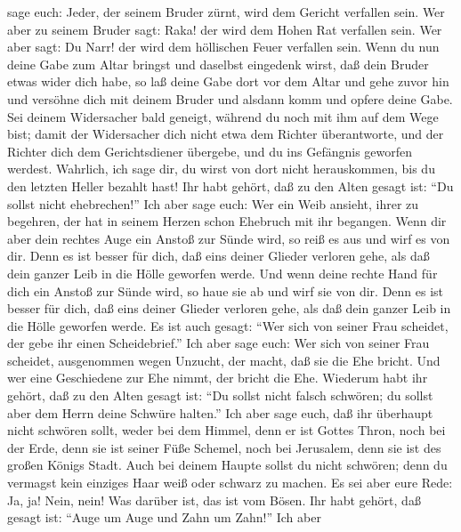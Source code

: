 sage euch: Jeder, der seinem Bruder zürnt, wird dem Gericht verfallen
sein. Wer aber zu seinem Bruder sagt: Raka! der wird dem Hohen Rat
verfallen sein. Wer aber sagt: Du Narr! der wird dem höllischen Feuer
verfallen sein.  Wenn du nun deine Gabe zum Altar bringst
und daselbst eingedenk wirst, daß dein Bruder etwas wider dich habe,
 so laß deine Gabe dort vor dem Altar und gehe zuvor hin
und versöhne dich mit deinem Bruder und alsdann komm und opfere deine
Gabe.  Sei deinem Widersacher bald geneigt, während du
noch mit ihm auf dem Wege bist; damit der Widersacher dich nicht etwa
dem Richter überantworte, und der Richter dich dem Gerichtsdiener
übergebe, und du ins Gefängnis geworfen werdest. 
Wahrlich, ich sage dir, du wirst von dort nicht herauskommen, bis du den
letzten Heller bezahlt hast!  Ihr habt gehört, daß zu den
Alten gesagt ist: ``Du sollst nicht ehebrechen!''  Ich
aber sage euch: Wer ein Weib ansieht, ihrer zu begehren, der hat in
seinem Herzen schon Ehebruch mit ihr begangen.  Wenn dir
aber dein rechtes Auge ein Anstoß zur Sünde wird, so reiß es aus und
wirf es von dir. Denn es ist besser für dich, daß eins deiner Glieder
verloren gehe, als daß dein ganzer Leib in die Hölle geworfen werde.
 Und wenn deine rechte Hand für dich ein Anstoß zur Sünde
wird, so haue sie ab und wirf sie von dir. Denn es ist besser für dich,
daß eins deiner Glieder verloren gehe, als daß dein ganzer Leib in die
Hölle geworfen werde.  Es ist auch gesagt: ``Wer sich von
seiner Frau scheidet, der gebe ihr einen Scheidebrief.'' 
Ich aber sage euch: Wer sich von seiner Frau scheidet, ausgenommen wegen
Unzucht, der macht, daß sie die Ehe bricht. Und wer eine Geschiedene zur
Ehe nimmt, der bricht die Ehe.  Wiederum habt ihr gehört,
daß zu den Alten gesagt ist: ``Du sollst nicht falsch schwören; du
sollst aber dem Herrn deine Schwüre halten.''  Ich aber
sage euch, daß ihr überhaupt nicht schwören sollt, weder bei dem Himmel,
denn er ist Gottes Thron,  noch bei der Erde, denn sie
ist seiner Füße Schemel, noch bei Jerusalem, denn sie ist des großen
Königs Stadt.  Auch bei deinem Haupte sollst du nicht
schwören; denn du vermagst kein einziges Haar weiß oder schwarz zu
machen.  Es sei aber eure Rede: Ja, ja! Nein, nein! Was
darüber ist, das ist vom Bösen.  Ihr habt gehört, daß
gesagt ist: ``Auge um Auge und Zahn um Zahn!''  Ich aber
